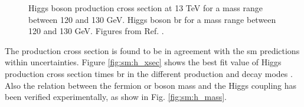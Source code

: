 \begin{figure}[ht]
\centering
{}
\caption{
 Higgs boson production cross section at 13 TeV for a mass range between 120 and 130 GeV.
 Higgs boson \gls{br} for a mass range between 120 and 130 GeV.
Figures from Ref.  \cite{deFlorian:2016spz}.}
\label{fig:sm:h_xsec_br}
\end{figure}

The production cross section is found to be in agreement with the \gls{sm} predictions within uncertainties. Figure \ref{fig:sm:h_xsec} shows the best fit value of Higgs production cross section times \gls{br} in the different production and decay modes \cite{Khachatryan:2016vau}. Also the relation between the fermion or boson mass and the Higgs coupling has been verified experimentally, as show in Fig. \ref{fig:sm:h_mass}. 

